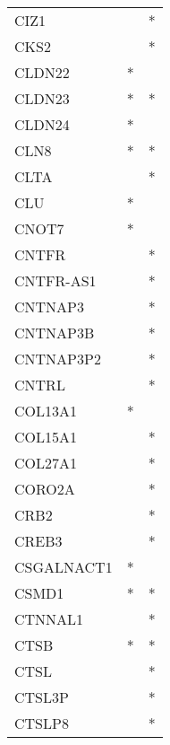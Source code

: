 \begin{longtable}{lcc}
CIZ1                  &                &          * \\
CKS2                  &                &          * \\
CLDN22                &              * &            \\
CLDN23                &              * &          * \\
CLDN24                &              * &            \\
CLN8                  &              * &          * \\
CLTA                  &                &          * \\
CLU                   &              * &            \\
CNOT7                 &              * &            \\
CNTFR                 &                &          * \\
CNTFR-AS1             &                &          * \\
CNTNAP3               &                &          * \\
CNTNAP3B              &                &          * \\
CNTNAP3P2             &                &          * \\
CNTRL                 &                &          * \\
COL13A1               &              * &            \\
COL15A1               &                &          * \\
COL27A1               &                &          * \\
CORO2A                &                &          * \\
CRB2                  &                &          * \\
CREB3                 &                &          * \\
CSGALNACT1            &              * &            \\
CSMD1                 &              * &          * \\
CTNNAL1               &                &          * \\
CTSB                  &              * &          * \\
CTSL                  &                &          * \\
CTSL3P                &                &          * \\
CTSLP8                &                &          * \\

\end{longtable}
